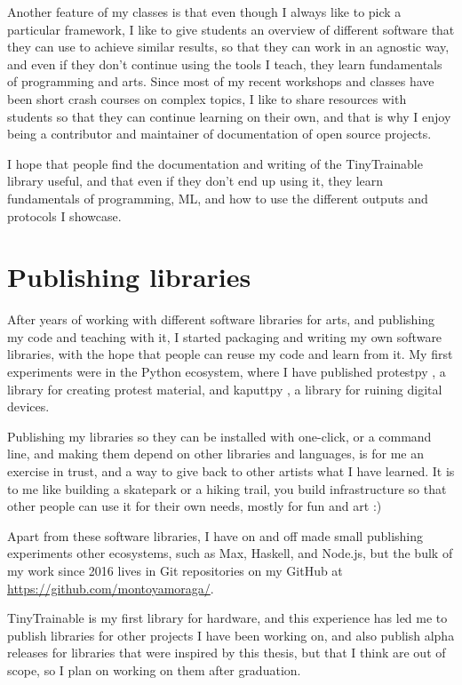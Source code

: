 Another feature of my classes is that even though I always like to pick a particular framework, I like to give students an overview of different software that they can use to achieve similar results, so that they can work in an agnostic way, and even if they don't continue using the tools I teach, they learn fundamentals of programming and arts. Since most of my recent workshops and classes have been short crash courses on complex topics, I like to share resources with students so that they can continue learning on their own, and that is why I enjoy being a contributor and maintainer of documentation of open source projects.

I hope that people find the documentation and writing of the TinyTrainable library useful, and that even if they don't end up using it, they learn fundamentals of programming, \acrshort{ML}, and how to use the different outputs and protocols I showcase.

\section{Publishing libraries}

After years of working with different software libraries for arts, and publishing my code and teaching with it, I started packaging and writing my own software libraries, with the hope that people can reuse my code and learn from it. My first experiments were in the Python ecosystem, where I have published protestpy \cite{website-pypi-protestpy}, a library for creating protest material, and kaputtpy \cite{website-pypi-kaputtpy}, a library for ruining digital devices.

Publishing my libraries so they can be installed with one-click, or a command line, and making them depend on other libraries and languages, is for me an exercise in trust, and a way to give back to other artists what I have learned. It is to me like building a skatepark or a hiking trail, you build infrastructure so that other people can use it for their own needs, mostly for fun and art :)

Apart from these software libraries, I have on and off made small publishing experiments other ecosystems, such as Max, Haskell, and Node.js, but the bulk of my work since 2016 lives in Git repositories on my GitHub at \url{https://github.com/montoyamoraga/}.

TinyTrainable is my first library for hardware, and this experience has led me to publish libraries for other projects I have been working on, and also publish alpha releases for libraries that were inspired by this thesis, but that I think are out of scope, so I plan on working on them after graduation.

